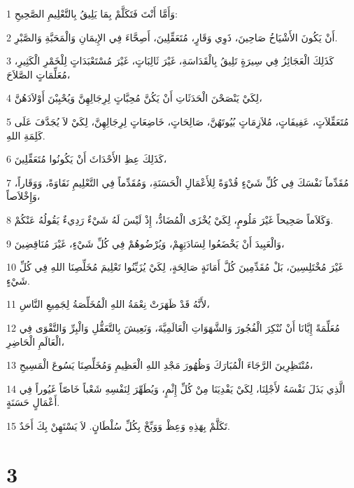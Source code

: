 \par 1 وَأَمَّا أَنْتَ فَتَكَلَّمْ بِمَا يَلِيقُ بِالتَّعْلِيمِ الصَّحِيحِ:
\par 2 أَنْ يَكُونَ الأَشْيَاخُ صَاحِينَ، ذَوِي وَقَارٍ، مُتَعَقِّلِينَ، أَصِحَّاءَ فِي الإِيمَانِ وَالْمَحَبَّةِ وَالصَّبْرِ.
\par 3 كَذَلِكَ الْعَجَائِزُ فِي سِيرَةٍ تَلِيقُ بِالْقَدَاسَةِ، غَيْرَ ثَالِبَاتٍ، غَيْرَ مُسْتَعْبَدَاتٍ لِلْخَمْرِ الْكَثِيرِ، مُعَلِّمَاتٍ الصَّلاَحَ،
\par 4 لِكَيْ يَنْصَحْنَ الْحَدَثَاتِ أَنْ يَكُنَّ مُحِبَّاتٍ لِرِجَالِهِنَّ وَيُحْبِبْنَ أَوْلاَدَهُنَّ،
\par 5 مُتَعَقِّلاَتٍ، عَفِيفَاتٍ، مُلاَزِمَاتٍ بُيُوتَهُنَّ، صَالِحَاتٍ، خَاضِعَاتٍ لِرِجَالِهِنَّ، لِكَيْ لاَ يُجَدَّفَ عَلَى كَلِمَةِ اللهِ.
\par 6 كَذَلِكَ عِظِ الأَحْدَاثَ أَنْ يَكُونُوا مُتَعَقِّلِينَ،
\par 7 مُقَدِّماً نَفْسَكَ فِي كُلِّ شَيْءٍ قُدْوَةً لِلأَعْمَالِ الْحَسَنَةِ، وَمُقَدِّماً فِي التَّعْلِيمِ نَقَاوَةً، وَوَقَاراً، وَإِخْلاَصاً،
\par 8 وَكَلاَماً صَحِيحاً غَيْرَ مَلُومٍ، لِكَيْ يُخْزَى الْمُضَادُّ، إِذْ لَيْسَ لَهُ شَيْءٌ رَدِيءٌ يَقُولُهُ عَنْكُمْ.
\par 9 وَالْعَبِيدَ أَنْ يَخْضَعُوا لِسَادَتِهِمْ، وَيُرْضُوهُمْ فِي كُلِّ شَيْءٍ، غَيْرَ مُنَاقِضِينَ،
\par 10 غَيْرَ مُخْتَلِسِينَ، بَلْ مُقَدِّمِينَ كُلَّ أَمَانَةٍ صَالِحَةٍ، لِكَيْ يُزَيِّنُوا تَعْلِيمَ مُخَلِّصِنَا اللهِ فِي كُلِّ شَيْءٍ.
\par 11 لأَنَّهُ قَدْ ظَهَرَتْ نِعْمَةُ اللهِ الْمُخَلِّصَةُ لِجَمِيعِ النَّاسِ،
\par 12 مُعَلِّمَةً إِيَّانَا أَنْ نُنْكِرَ الْفُجُورَ وَالشَّهَوَاتِ الْعَالَمِيَّةَ، وَنَعِيشَ بِالتَّعَقُّلِ وَالْبِرِّ وَالتَّقْوَى فِي الْعَالَمِ الْحَاضِرِ،
\par 13 مُنْتَظِرِينَ الرَّجَاءَ الْمُبَارَكَ وَظُهُورَ مَجْدِ اللهِ الْعَظِيمِ وَمُخَلِّصِنَا يَسُوعَ الْمَسِيحِ،
\par 14 الَّذِي بَذَلَ نَفْسَهُ لأَجْلِنَا، لِكَيْ يَفْدِيَنَا مِنْ كُلِّ إِثْمٍ، وَيُطَهِّرَ لِنَفْسِهِ شَعْباً خَاصّاً غَيُوراً فِي أَعْمَالٍ حَسَنَةٍ.
\par 15 تَكَلَّمْ بِهَذِهِ وَعِظْ وَوَبِّخْ بِكُلِّ سُلْطَانٍ. لاَ يَسْتَهِنْ بِكَ أَحَدٌ.

\chapter{3}

